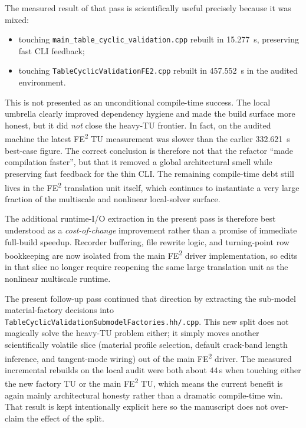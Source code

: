 The measured result of that pass is scientifically useful precisely because it
was mixed:
\begin{itemize}
  \item touching \texttt{main\_table\_cyclic\_validation.cpp} rebuilt in
    15.277~s, preserving fast CLI feedback;
  \item touching \texttt{TableCyclicValidationFE2.cpp} rebuilt in
    457.552~s in the audited environment.
\end{itemize}
This is not presented as an unconditional compile-time success.  The local
umbrella clearly improved dependency hygiene and made the build surface more
honest, but it did \emph{not} close the heavy-TU frontier.  In fact, on the
audited machine the latest FE\textsuperscript{2} TU measurement was slower than
the earlier 332.621~s best-case figure.  The correct conclusion is therefore
not that the refactor ``made compilation faster'', but that it removed a
global architectural smell while preserving fast feedback for the thin CLI.
The remaining compile-time debt still lives in the FE\textsuperscript{2}
translation unit itself, which continues to instantiate a very large fraction
of the multiscale and nonlinear local-solver surface.

The additional runtime-I/O extraction in the present pass is therefore best
understood as a \emph{cost-of-change} improvement rather than a promise of
immediate full-build speedup.  Recorder buffering, file rewrite logic, and
turning-point row bookkeeping are now isolated from the main FE\textsuperscript{2}
driver implementation, so edits in that slice no longer require reopening the
same large translation unit as the nonlinear multiscale runtime.

The present follow-up pass continued that direction by extracting the
sub-model material-factory decisions into
\texttt{TableCyclicValidationSubmodelFactories}\allowbreak\texttt{.hh/.cpp}.
This new split does not magically solve the heavy-TU problem either; it simply
moves another scientifically volatile slice (material profile selection,
default crack-band length inference, and tangent-mode wiring) out of the main
FE\textsuperscript{2} driver.  The measured incremental rebuilds on the local
audit were both about \(44\)\,s when touching either the new factory TU or the
main FE\textsuperscript{2} TU, which means the current benefit is again mainly
architectural honesty rather than a dramatic compile-time win.  That result is
kept intentionally explicit here so the manuscript does not over-claim the
effect of the split.

